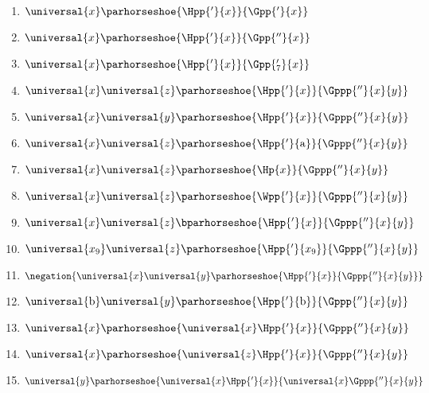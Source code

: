 \begin{multicols}{2}
\begin{enumerate}
\item {$\universal{\variable{x}}\parhorseshoe{\Hpp{'}{\variable{x}}}{\Gpp{'}{\variable{x}}}$}
\item {$\universal{\variable{x}}\parhorseshoe{\Hpp{'}{\variable{x}}}{\Gpp{''}{\variable{x}}}$}
\item {$\universal{\variable{x}}\parhorseshoe{\Hpp{'}{\variable{x}}}{\Gpp{'_7}{\variable{x}}}$}
\item {$\universal{\variable{x}}\universal{\variable{z}}\parhorseshoe{\Hpp{'}{\variable{x}}}{\Gppp{''}{\variable{x}}{\variable{y}}}$}
\item {$\universal{\variable{x}}\universal{\variable{y}}\parhorseshoe{\Hpp{'}{\variable{x}}}{\Gppp{''}{\variable{x}}{\variable{y}}}$}
\item {$\universal{\variable{x}}\universal{\variable{z}}\parhorseshoe{\Hpp{'}{\constant{a}}}{\Gppp{''}{\variable{x}}{\variable{y}}}$}
\item {$\universal{\variable{x}}\universal{\variable{z}}\parhorseshoe{\Hp{\variable{x}}}{\Gppp{''}{\variable{x}}{\variable{y}}}$}
\item {$\universal{\variable{x}}\universal{\variable{z}}\parhorseshoe{\Wpp{'}{\variable{x}}}{\Gppp{''}{\variable{x}}{\variable{y}}}$}
\item {$\universal{\variable{x}}\universal{\variable{z}}\bparhorseshoe{\Hpp{'}{\variable{x}}}{\Gppp{''}{\variable{x}}{\variable{y}}}$}
\item {$\universal{\variable{x}_9}\universal{\variable{z}}\parhorseshoe{\Hpp{'}{\variable{x}_9}}{\Gppp{''}{\variable{x}}{\variable{y}}}$}
\item {$\negation{\universal{\variable{x}}\universal{\variable{y}}\parhorseshoe{\Hpp{'}{\variable{x}}}{\Gppp{''}{\variable{x}}{\variable{y}}}}$}
\item {$\universal{\constant{b}}\universal{\variable{y}}\parhorseshoe{\Hpp{'}{\constant{b}}}{\Gppp{''}{\variable{x}}{\variable{y}}}$}
\item {$\universal{\variable{x}}\parhorseshoe{\universal{\variable{x}}\Hpp{'}{x}}{\Gppp{''}{\variable{x}}{\variable{y}}}$}
\item {$\universal{\variable{x}}\parhorseshoe{\universal{\variable{z}}\Hpp{'}{x}}{\Gppp{''}{\variable{x}}{\variable{y}}}$}
\item {$\universal{\variable{y}}\parhorseshoe{\universal{\variable{x}}\Hpp{'}{x}}{\universal{\variable{x}}\Gppp{''}{\variable{x}}{\variable{y}}}$}
\end{enumerate}
\end{multicols}

